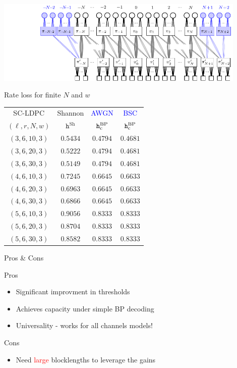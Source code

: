\documentclass[10pt]{beamer}
\begin{document}
\begin{frame}
  \includegraphics[width=0.9\textwidth]{./Figures/SC/spatially-coupled-ensemble.pdf}
\end{frame}

\begin{frame}{Rate loss for finite $N$ and $w$}
\centering
\begin{tabular}{|c|c|c|c|}
  \hline
  SC-LDPC & Shannon & \textcolor{blue}{AWGN} & \textcolor{blue}{BSC} \\
  $(\ell,r,N,w)$ & $\texttt{h}^{\mathrm{Sh}}$  & $\texttt{h}^{\mathrm{BP}}_{\mathrm{c}}$ & $\texttt{h}^{\mathrm{BP}}_{\mathrm{c}}$  \\
  \hline
  $(3,6,10,3)$ & $0.5434$ & $0.4794$ & $0.4681$ \\
  $(3,6,20,3)$ & $0.5222$ & $0.4794$ & $0.4681$ \\
  $(3,6,30,3)$ & $0.5149$ & $0.4794$ & $0.4681$ \\
  \hline
  $(4,6,10,3)$ & $0.7245$ & $0.6645$ & $0.6633$ \\
  $(4,6,20,3)$ & $0.6963$ & $0.6645$ & $0.6633$ \\
  $(4,6,30,3)$ & $0.6866$ & $0.6645$ & $0.6633$ \\
  \hline
  $(5,6,10,3)$ & $0.9056$ & $0.8333$ & $0.8333$ \\
  $(5,6,20,3)$ & $0.8704$ & $0.8333$ & $0.8333$ \\
  $(5,6,30,3)$ & $0.8582$ & $0.8333$ & $0.8333$ \\
  \hline
\end{tabular}
\end{frame}

\begin{frame}{Pros \& Cons}
\begin{defn}{Pros}
\begin{itemize}
\item Significant improvment in thresholds
\vspace{0.25cm}
\item Achieves capacity under {\blue simple BP decoding}
\vspace{0.25cm}
\item {\blue Universality} - works for all channels models! 
\vspace{0.25cm}
\end{itemize}
\end{defn}

\begin{defn}{Cons}
\begin{itemize}
\item Need \textcolor{red}{large} blocklengths to leverage the gains
\end{itemize}
\end{defn}
\end{frame}
\end{document}
